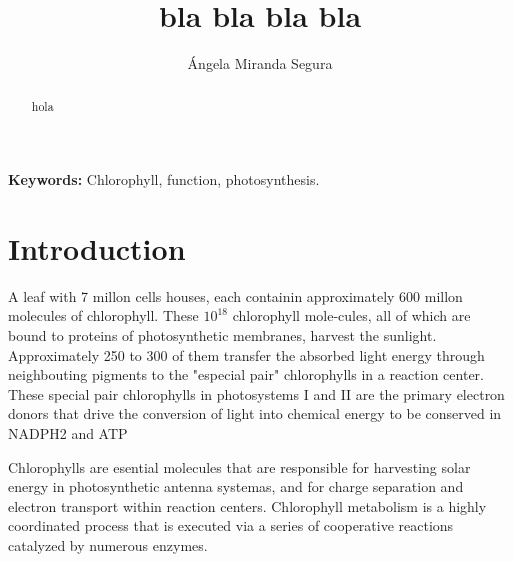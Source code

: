 \documentclass[a4paper, 11pt]{article}
\author{Ángela Miranda Segura}
\title{bla bla bla bla}
\begin{document}
\maketitle
\begin{minipage}{4cm}
	\textbf{Keywords:}
	Chlorophyll, function, photosynthesis.
\end{minipage}
\begin{minipage}{7cm}
	\begin{abstract}
		hola
	\end{abstract}
\end{minipage}


\twocolumn
\section{Introduction}
 	A leaf with 7 millon cells houses, each containin approximately 600 millon molecules of chlorophyll. These $10^18$ chlorophyll mole-cules, all of which are bound to proteins of photosynthetic membranes, harvest the sunlight. Approximately 250 to 300 of them transfer the absorbed light energy through neighbouting pigments to the "especial pair" chlorophylls in a reaction center. These special pair chlorophylls in photosystems I and II are the primary electron donors that drive the conversion of light into chemical energy to be conserved in NADPH2 and ATP \cite{VonWettstein1995}
 	

	Chlorophylls are esential molecules that are responsible for harvesting solar energy in photosynthetic antenna systemas, and for charge separation and electron transport within reaction centers. Chlorophyll metabolism is a highly coordinated process that is executed via a series of cooperative reactions catalyzed by numerous enzymes.\\
	
\end{document}
